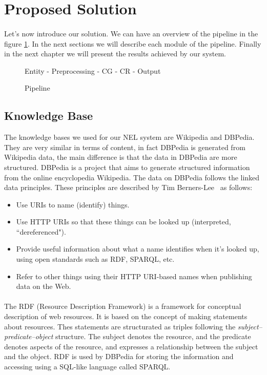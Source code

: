 \newpage
\section{Proposed Solution}
\paragraph{}Let's now introduce our solution. We can have an overview of the pipeline in the figure \ref{fig:pipeline}. In the next sections we will describe each module of the pipeline. Finally in the next chapter we will present the results achieved by our system.

\begin{figure}[ht]
\begin{center}
Entity - Preprocessing - CG - CR - Output
\end{center}   
\caption{Pipeline}
\label{fig:pipeline}
\end{figure}

\subsection{Knowledge Base}
The knowledge bases we used for our NEL system are Wikipedia and DBPedia. They are very similar in terms of content, in fact DBPedia is generated from Wikipedia data, the main difference is that the data in DBPedia are more structured. DBPedia is a project that aims to generate structured information from the online encyclopedia Wikipedia. The data on DBPedia follows the linked data principles. These principles are described by Tim Berners-Lee~\cite{timbernerslee2006linkeddata} as follows:

\begin{itemize}[itemsep = 0.1em]
\item Use URIs to name (identify) things.
\item Use HTTP URIs so that these things can be looked up (interpreted, ``dereferenced").
\item Provide useful information about what a name identifies when it's looked up, using open standards such as RDF, SPARQL, etc.
\item Refer to other things using their HTTP URI-based names when publishing data on the Web.
\end{itemize}

\paragraph{}
The RDF (Resource Description Framework) is a framework for conceptual description of web resources. It is based on the concept of making statements about resources. Thes statements are structurated as triples following the \textit{subject–predicate–object} structure. The subject denotes the resource, and the predicate denotes aspects of the resource, and expresses a relationship between the subject and the object. RDF is used by DBPedia for storing the information and accessing using a SQL-like language called SPARQL.

